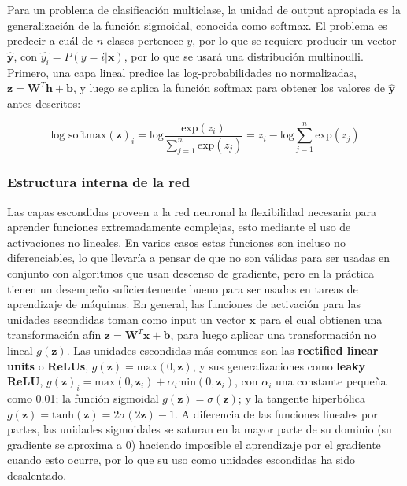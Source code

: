 Para un problema de clasificaci\'on multiclase, la unidad de output apropiada es la generalizaci\'on de la funci\'on sigmoidal, conocida como softmax. El problema es predecir a cu\'al de $n$ clases pertenece $y$, por lo que se requiere producir un vector $\hat{\bm{y}}$, con $\hat{y_{i}} = P(y=i|\bm{x})$, por lo que se usar\'a una distribuci\'on multinoulli. Primero, una capa lineal predice las log-probabilidades no normalizadas, $\bm{z} = \bm{W}^{T}\bm{h} + \bm{b}$, y luego se aplica la funci\'on softmax para obtener los valores de $\hat{\bm{y}}$ antes descritos:

\begin{equation}
\textrm{log softmax}(\bm{z})_{i} = \textrm{log}\frac{\textrm{exp}(z_{i})}{\sum_{j=1}^{n}\textrm{exp}({z_{j}})} = z_{i} - \textrm{log}\sum_{j=1}^{n}\textrm{exp}({z_{j}})
\end{equation}

\subsubsection{Estructura interna de la red}

Las capas escondidas proveen a la red neuronal la flexibilidad necesaria para aprender funciones extremadamente complejas, esto mediante el uso de activaciones no lineales. En varios casos estas funciones son incluso no diferenciables, lo que llevar\'ia a pensar de que no son v\'alidas para ser usadas en conjunto con algoritmos que usan descenso de gradiente, pero en la pr\'actica tienen un desempe\~{n}o suficientemente bueno para ser usadas en tareas de aprendizaje de m\'aquinas. En general, las funciones de activaci\'on para las unidades escondidas toman como input un vector $\bm{x}$ para el cual obtienen una transformaci\'on af\'in $\bm{z} = \bm{W}^{T}\bm{x} + \bm{b}$, para luego aplicar una transformaci\'on no lineal $g(\bm{z})$. Las unidades escondidas m\'as comunes son las \textbf{rectified linear units} o \textbf{ReLUs}, $g(\bm{z}) = \textrm{max}(0, \bm{z})$, y sus generalizaciones como \textbf{leaky ReLU}, $g(\bm{z})_{i} = \textrm{max}(0, \bm{z}_{i}) + \alpha_{i}\textrm{min}(0, \bm{z}_{i})$, con $\alpha_{i}$ una constante peque\~{n}a como 0.01; la funci\'on sigmoidal $g(\bm{z}) = \sigma(\bm{z})$; y la tangente hiperb\'olica $g(\bm{z}) =  \textrm{tanh}(\bm{z}) = 2\sigma(2\bm{z}) - 1$. A diferencia de las funciones lineales por partes, las unidades sigmoidales se saturan en la mayor parte de su dominio (su gradiente se aproxima a 0) haciendo imposible el aprendizaje por el gradiente cuando esto ocurre, por lo que su uso como unidades escondidas ha sido desalentado.

